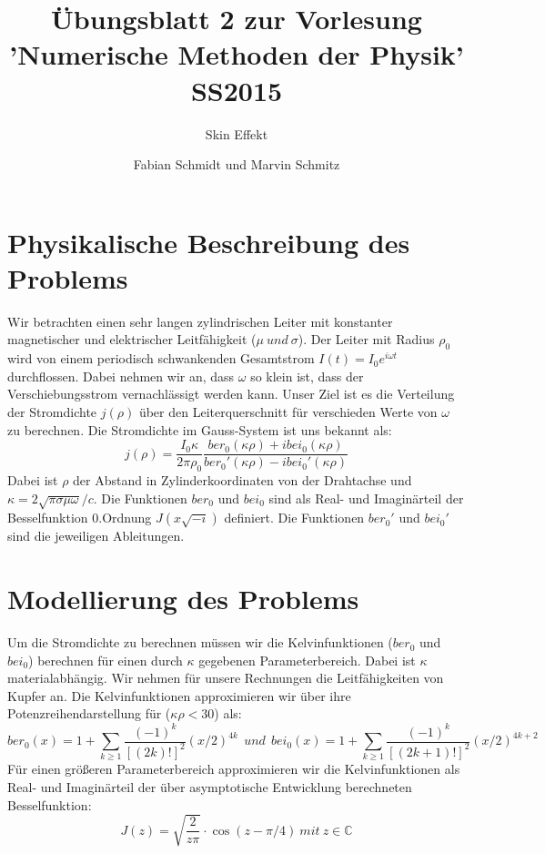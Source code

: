 \documentclass[ngerman]{scrartcl}
\begin{document}
\title{Übungsblatt 2 zur Vorlesung 'Numerische Methoden der Physik' SS2015}
\subtitle{Skin Effekt}
\author{Fabian Schmidt und Marvin Schmitz}
\maketitle

\newpage

\section*{Physikalische Beschreibung des Problems}

Wir betrachten einen sehr langen zylindrischen Leiter mit konstanter magnetischer und elektrischer Leitfähigkeit ($ \mu\ und\ \sigma $). Der Leiter mit Radius $\rho_0$ wird von einem periodisch schwankenden Gesamtstrom $I(t)=I_0 e^{i\omega t}$ durchflossen. Dabei nehmen wir an, dass $\omega$ so klein ist, dass der Verschiebungsstrom vernachlässigt werden kann. Unser Ziel ist es die Verteilung der Stromdichte $j(\rho)$ über den Leiterquerschnitt für verschieden Werte von $\omega$ zu berechnen.
Die Stromdichte im Gauss-System ist uns bekannt als:
\begin{equation*}
j(\rho)= \frac{I_0 \kappa}{2\pi \rho_0} \frac{ber_0(\kappa \rho)+ibei_0(\kappa \rho)}{ber_0'(\kappa \rho)-ibei_0'(\kappa \rho)}
\end{equation*}
Dabei ist $\rho$ der Abstand in Zylinderkoordinaten von der Drahtachse und $\kappa = 2\sqrt{\pi \sigma \mu \omega}/c$. Die Funktionen $ber_0$ und $bei_0$ sind als Real- und Imaginärteil der Besselfunktion 0.Ordnung $J(x\sqrt{-i})$ definiert. Die Funktionen $ber_0'$ und $bei_0'$ sind die jeweiligen Ableitungen.

\section*{Modellierung des Problems}

Um die Stromdichte zu berechnen müssen wir die Kelvinfunktionen ($ber_0$ und $bei_0$) berechnen für einen durch $\kappa$ gegebenen Parameterbereich. Dabei ist $\kappa$ materialabhängig. Wir nehmen für unsere Rechnungen die Leitfähigkeiten von Kupfer an. Die Kelvinfunktionen approximieren wir über ihre Potenzreihendarstellung für ($\kappa \rho<30$) als:
\begin{equation*}
ber_0(x) = 1+ \sum_{k\ge1} \frac{(-1)^k}{[(2k)!]^2}(x/2)^{4k} \ \ und\ \ bei_0(x) = 1+ \sum_{k\ge1} \frac{(-1)^k}{[(2k+1)!]^2}(x/2)^{4k+2}
\end{equation*}
Für einen größeren Parameterbereich approximieren wir die Kelvinfunktionen als Real- und Imaginärteil der über asymptotische Entwicklung berechneten Besselfunktion:
\begin{equation*}
J(z) = \sqrt{\frac{2}{z\pi}} \cdot \cos(z-\pi/4)\ mit\ z \in \mathbb{C}
\end{equation*}
\end{document}
